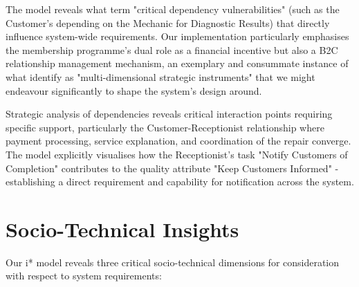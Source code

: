 \documentclass[14pt,a4paper]{article}
\begin{document}
The model reveals what \textcite[p. 78]{Horkoff2019} term "critical dependency vulnerabilities" (such as the Customer's depending on the Mechanic for Diagnostic Results) that directly influence system-wide requirements. Our implementation particularly emphasises the membership programme's dual role as a financial incentive but also a B2C relationship management mechanism, an exemplary and consummate instance of what \textcite[p. 177]{Estrada2020} identify as "multi-dimensional strategic instruments" that we might endeavour significantly to shape the system's design around.

Strategic analysis of dependencies reveals critical interaction points requiring specific support, particularly the Customer-Receptionist relationship where payment processing, service explanation, and coordination of the repair converge. The model explicitly visualises how the Receptionist's task "Notify Customers of Completion" contributes to the quality attribute "Keep Customers Informed" - establishing a direct requirement and capability for notification across the system.

\section{Socio-Technical Insights}

Our i* model reveals three critical socio-technical dimensions for consideration with respect to system requirements:
\end{document}
